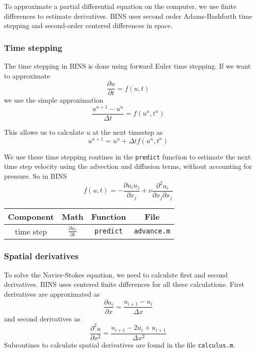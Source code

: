 \documentclass[12pt]{article}
\begin{document}
To approximate a partial differential equation on the computer, we use finite differences to estimate derivatives.  BINS uses second order Adams-Bashforth time stepping and second-order centered differences in space.

\subsubsection{Time stepping}
The time stepping in BINS is done using forward Euler time stepping.  If we want to approximate 
\[ \frac{\partial u}{\partial t} = f(u,t) \]
we use the simple approximation
\[ \frac{u^{n+1}-u^n}{\Delta t} = f(u^n,t^n)\]

This allows us to calculate $u$ at the next timestep as
\begin{equation}
u^{n+1} = u^n + \Delta t f(u^n,t^n)
\end{equation}

We use these time stepping routines in the \texttt{predict} function to estimate the next time step velocity using the advection and diffusion terms, without accounting for pressure.  So in BINS
\[ f(u,t) = -\frac{\partial u_i u_j}{\partial x_j} + \nu \frac{\partial^2 u_i}{\partial x_j \partial x_j} \]

\begin{center}
\begin{tabular}{|c|c|c|c|}
\hline 
\bf{Component} & \bf{Math} & \bf{Function} & \bf{File}\\ 
\hline 
time step & $\frac{\partial u_i}{\partial t}$ & \texttt{predict}& \texttt{advance.m} \\ 
\hline 
\end{tabular} 
\end{center}

\subsubsection{Spatial derivatives}
To solve the Navier-Stokes equation, we need to calculate first and second derivatives.  BINS uses centered finite differences for all these calculations.  First derivatives are approximated as
\begin{equation}
\label{firstDeriv}
\frac{\partial u_i}{\partial x} = \frac{u_{i+1} - u_{i}}{\Delta x}
\end{equation}
and second derivatives as
\begin{equation}
\label{secondDeriv}
\frac{\partial^2 u}{\partial x^2} = \frac{u_{i+1} -2 u_i + u_{i+1}}{\Delta x^2}
\end{equation}
Subroutines to calculate spatial derivatives are found in the file \texttt{calculus.m}.
\end{document}
